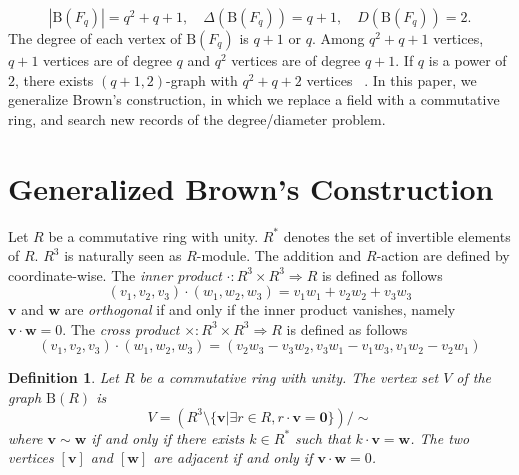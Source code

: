 \documentclass{article}
\newtheorem{Def}{Definition}
\newcommand{\Z}{\mathbb Z}
\newcommand{\N}{\mathbb N}
\newcommand{\B}{\mathrm{B}}
\begin{document}
\[|\B(F_q)| = q^2+q+1, \quad
\Delta(\B(F_q)) = q+1, \quad
D(\B(F_q))=2.
\]
The degree of each vertex of $\B(F_q)$ is $q+1$ or $q$. 
Among $q^2+q+1$ vertices, $q+1$ vertices are of degree $q$ and $q^2$ vertices are of degree $q+1$.
If $q$ is a power of $2$, there exists $(q+1,2)$-graph with $q^2+q+2$ vertices ~\cite{journals/networks/ErdosFH80}.
In this paper, we generalize Brown's construction, in which we replace a field with a commutative ring, and search new records of the degree/diameter problem.

\iffalse

The {\it tensor product} of two graphs $G_1=(V_1,E_1),G_2=(V_2,E_2)$ is a graph $G_1 \otimes G_2$ such that the vertex set is a cartesian product of $V_1$ and $V_2$ and two vertices $(v_1,v_2) \sim (w_1,w_2)$ if and only if $v_1 \sim v_2$ and $w_1 \sim w_2$. If $G_1, G_2$ are regular, the tensor product $G_1 \times G_2$ is also regular. 

\fi

\section{Generalized Brown's Construction}

Let $R$ be a commutative ring with unity. 
$R^*$ denotes the set of invertible elements of $R$.
$R^3$ is naturally seen as $R$-module. 
The addition and $R$-action are defined by coordinate-wise.
The {\it inner product} $\cdot: R^3 \times R^3 \Rightarrow R$ is defined as follows
\[ (v_1,v_2,v_3) \cdot (w_1,w_2,w_3) = v_1 w_1 + v_2 w_2 + v_3 w_3 \]
${\bm v}$ and ${\bm w}$ are {\it orthogonal} if and only if the inner product vanishes, namely ${\bm v} \cdot {\bm w} = 0$.
The {\it cross product} $\times: R^3 \times R^3 \Rightarrow R$ is defined as follows
\[ (v_1,v_2,v_3) \cdot (w_1,w_2,w_3) = ( v_2 w_3 - v_3 w_2, v_3 w_1 - v_1 w_3, v_1 w_2 - v_2 w_1 ) \]
\iffalse
A {\it domain} $D$ is a commutative ring without zero divisors.
A {\it Euclidean domain} is a domain $E$ with a function called degree $d: E \setminus \{0\} \Rightarrow \N$ such that for all non-zero $a,b$ in $E$ there exists $q,r \in E, a = q b + r$ where $d(r) < d(b)$. Every {\it Euclidean domain} is a {\it unique factorization domain}, in which for all $r$ in $E$, there exist prime elements $u_i$ and natural numbers $k_i$ such that $r = \Pi_i u_i^{k_i}$.
The ring of integers $\Z$ is a example of the Euclidean domain whose degree function is an identity function.
\fi

\begin{Def}
Let $R$ be a commutative ring with unity. The vertex set $V$ of the graph $\B(R)$ is 
\[ V = ( R^3 \setminus \{\bm v | \exists r \in R, r \cdot {\bm v} = {\bm 0} \} ) / \sim\]
where $\bm v \sim \bm w$ if and only if there exists $k \in R^*$ such that $k \cdot {\bm v} = {\bm w}$. The two vertices $[\bm v]$ and $[\bm w]$ are adjacent if and only if ${\bm v} \cdot {\bm w} = 0$.
\end{Def}
\end{document}
